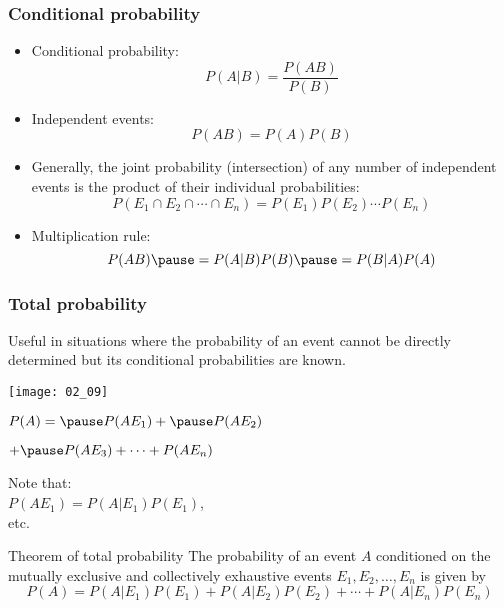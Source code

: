 \documentclass[usenames,dvipsnames,smaller]{beamer}
\newcommand{\?}{\stackrel{?}{=}}
\newcommand{\fr}{\frac}
\begin{document}
\begin{frame}
  \frametitle{Conditional probability}
  \begin{itemize}[<+->]
  \item Conditional probability:\pause
    \begin{equation}
      P(A|B) = \fr{P(AB)}{P(B)}
    \end{equation}

  \item Independent events: \pause
    \begin{equation}
      P(AB) = P(A)P(B)
    \end{equation}

    \item
    Generally, the joint probability (intersection) of any number of independent events is the product of their individual probabilities: \pause
    \begin{equation}
      P(E_{1}\cap E_{2}\cap \cdots \cap E_{n}) = P(E_{1})P(E_{2})\cdots P(E_{n})
    \end{equation}
  \item Multiplication rule:\pause
    \begin{equation}
      P(AB) \pause = P(A|B)P(B)\pause = P(B|A)P(A)
    \end{equation}
  \end{itemize}
\end{frame}

\begin{frame}
  \frametitle{Total probability}

  Useful in situations where the probability of an event cannot be directly
  determined but its conditional probabilities are known.
  
  \pause

  
  \begin{minipage}[b]{.55\linewidth}
    \texttt{[image: 02\_09]}    
  \end{minipage}\pause\quad
  \begin{minipage}[b]{.35\linewidth}\raggedright
    $P(A)= \pause P(AE_{1}) + \pause P(AE_{2}) $ \pause
    
    \quad\quad\quad $+ \pause P(AE_{3}) + \cdots + P(AE_{n})$  \pause

    \medskip
    
    Note that:\\\pause
    \alert{$P(AE_1) = P(A|E_1)P(E_1)$},\\ etc.
  \end{minipage}
  \pause
  \begin{block}{Theorem of total probability}
    The probability of an event $A$ conditioned on the mutually exclusive and
    collectively exhaustive events $E_1, E_2, \ldots, E_n$ is given by \pause
    \begin{equation}
      \label{eq:19}
      P(A) = P(A|E_1)P(E_1) + P(A|E_2)P(E_2) + \cdots + P(A|E_n)P(E_n)
    \end{equation}
  \end{block}

 
\end{frame}
\end{document}
